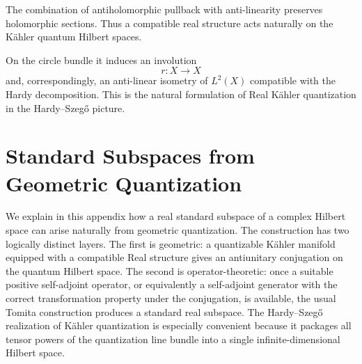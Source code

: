\documentclass[a4paper,11pt]{article}
\theoremstyle{definition}
\begin{document}
The combination of antiholomorphic pullback with anti-linearity preserves
holomorphic sections.  Thus a compatible real structure acts naturally on
the K\"ahler quantum Hilbert spaces.

On the circle bundle it induces an involution
\begin{equation}
    r:X\rightarrow X
\end{equation}
and, correspondingly, an anti-linear isometry of $L^2(X)$ compatible with the
Hardy decomposition.  This is the natural formulation of Real K\"ahler
quantization in the Hardy--Szeg\H{o} picture.
\section{Standard Subspaces from Geometric Quantization}
\label{app:standard_subspaces_geometric_quantization}

We explain in this appendix how a real standard subspace of a complex Hilbert
space can arise naturally from geometric quantization.  The construction has
two logically distinct layers.  The first is geometric: a quantizable
K\"ahler manifold equipped with a compatible Real structure gives an
antiunitary conjugation on the quantum Hilbert space.  The second is
operator-theoretic: once a suitable positive self-adjoint operator, or
equivalently a self-adjoint generator with the correct transformation
property under the conjugation, is available, the usual Tomita construction
produces a standard real subspace.  The Hardy--Szeg\H{o} realization of
K\"ahler quantization is especially convenient because it packages all tensor
powers of the quantization line bundle into a single infinite-dimensional
Hilbert space.
\end{document}
